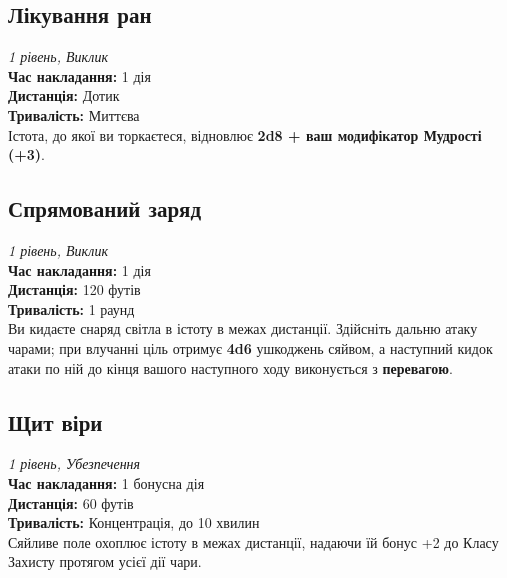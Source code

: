 \documentclass[letterpaper,openany,oneside,twocolumn]{book}
\begin{document}
\subsection*{Лікування ран}
\textit{1 рівень, Виклик}\\
\textbf{Час накладання:} 1 дія \\
\textbf{Дистанція:} Дотик \\
\textbf{Тривалість:} Миттєва \\
Істота, до якої ви торкаєтеся, відновлює \textbf{2d8 + ваш модифікатор Мудрості (+3)}.

\subsection*{Спрямований заряд}
\textit{1 рівень, Виклик}\\
\textbf{Час накладання:} 1 дія \\
\textbf{Дистанція:} 120 футів \\
\textbf{Тривалість:} 1 раунд \\
Ви кидаєте снаряд світла в істоту в межах дистанції. Здійсніть дальню атаку чарами; при влучанні ціль отримує \textbf{4d6} ушкоджень сяйвом, а наступний кидок атаки по ній до кінця вашого наступного ходу виконується з \textbf{перевагою}.

\subsection*{Щит віри}
\textit{1 рівень, Убезпечення}\\
\textbf{Час накладання:} 1 бонусна дія \\
\textbf{Дистанція:} 60 футів \\
\textbf{Тривалість:} Концентрація, до 10 хвилин \\
Сяйливе поле охоплює істоту в межах дистанції, надаючи їй бонус +2 до Класу Захисту протягом усієї дії чари.
\end{document}
